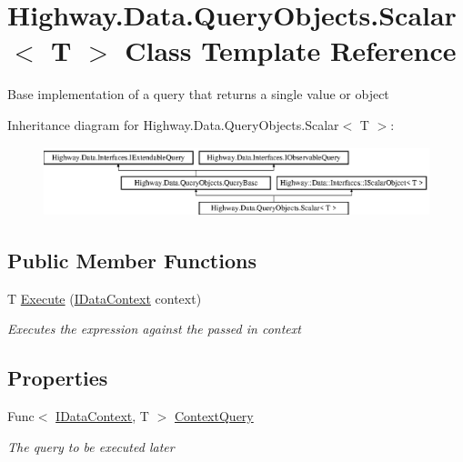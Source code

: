 \hypertarget{class_highway_1_1_data_1_1_query_objects_1_1_scalar-g}{\section{Highway.\-Data.\-Query\-Objects.\-Scalar$<$ T $>$ Class Template Reference}
\label{class_highway_1_1_data_1_1_query_objects_1_1_scalar-g}
}


Base implementation of a query that returns a single value or object  


Inheritance diagram for Highway.\-Data.\-Query\-Objects.\-Scalar$<$ T $>$\-:\begin{figure}[H]
\begin{center}
\leavevmode
\includegraphics[height=2.021661cm]{class_highway_1_1_data_1_1_query_objects_1_1_scalar-g}
\end{center}
\end{figure}
\subsection*{Public Member Functions}
\begin{DoxyCompactItemize}
\item 
T \hyperlink{class_highway_1_1_data_1_1_query_objects_1_1_scalar-g_aff12d516dd21701d1f48c9fb370c5683}{Execute} (\hyperlink{interface_highway_1_1_data_1_1_interfaces_1_1_i_data_context}{I\-Data\-Context} context)
\begin{DoxyCompactList}\small\item\em Executes the expression against the passed in context \end{DoxyCompactList}\end{DoxyCompactItemize}
\subsection*{Properties}
\begin{DoxyCompactItemize}
\item 
Func$<$ \hyperlink{interface_highway_1_1_data_1_1_interfaces_1_1_i_data_context}{I\-Data\-Context}, T $>$ \hyperlink{class_highway_1_1_data_1_1_query_objects_1_1_scalar-g_acb183b773f6c4bb8c9a989c1144095db}{Context\-Query}
\begin{DoxyCompactList}\small\item\em The query to be executed later \end{DoxyCompactList}\end{DoxyCompactItemize}
